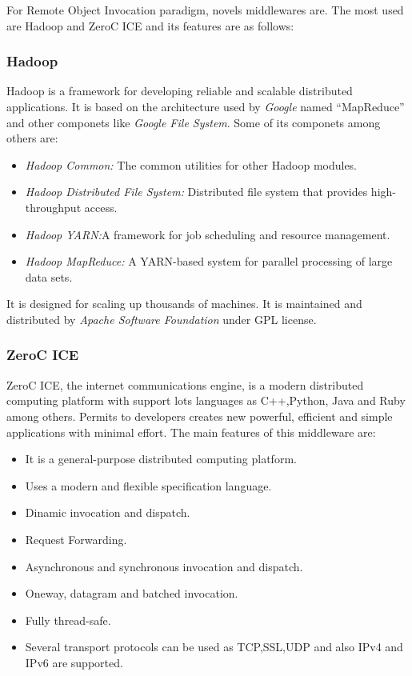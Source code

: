 For Remote Object Invocation paradigm, novels middlewares are. The most used are
Hadoop and ZeroC ICE and its features are as follows:

\subsubsection{Hadoop}
Hadoop is a framework for developing  reliable and scalable
distributed applications. It is based on
the architecture used by \emph{Google} named ``MapReduce'' and other componets
like \emph{Google File System}. 
Some of its componets among others are:
\begin{itemize}
\item \emph{Hadoop Common:} The common utilities for other Hadoop modules.
\item \emph{Hadoop Distributed File System:} Distributed file system that
  provides high-throughput access.
\item \emph{Hadoop YARN:}A framework for job scheduling and resource management.
\item \emph{Hadoop MapReduce:} A YARN-based system for parallel processing of
  large data sets.
\end{itemize}
It is designed for scaling up thousands of machines. It
is maintained and distributed by \emph{Apache Software Foundation} under GPL license.
 
\subsubsection{ZeroC ICE}
ZeroC ICE, the internet communications engine, is a modern distributed computing
platform with support lots languages as C++,Python, Java and Ruby among others.
Permits to developers creates new powerful, efficient and simple applications
with minimal effort.
The main features of this middleware are:
\begin{itemize}
\item It is a general-purpose distributed computing platform.
\item Uses a modern and flexible specification language.
\item Dinamic invocation and dispatch.
\item Request Forwarding.
\item Asynchronous and synchronous invocation and dispatch.
\item Oneway, datagram and batched invocation.
\item Fully thread-safe.
\item Several transport protocols can be used as TCP,SSL,UDP and also IPv4 and
  IPv6 are supported.
\end{itemize}

